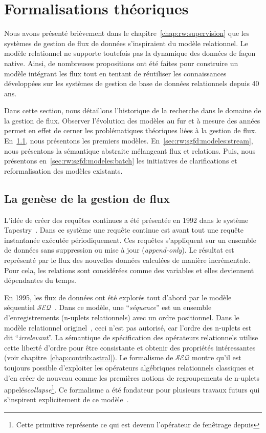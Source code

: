 \section{Formalisations théoriques}\label{sec:rw:sgfd:modeles}
Nous avons présenté brièvement dans le chapitre~\ref{chap:rw:supervision} que les systèmes de gestion de flux de données s'inspiraient du modèle relationnel. Le modèle relationnel ne supporte toutefois pas la dynamique des données de façon native. Ainsi, de nombreuses propositions ont été faites pour construire un modèle intégrant les flux tout en tentant de réutiliser les connaissances développées sur les systèmes de gestion de base de données relationnels depuis 40 ans.

Dans cette section, nous détaillons l'historique de la recherche dans le domaine de la gestion de flux. Observer l'évolution des modèles au fur et à mesure des années permet en effet de cerner les problématiques théoriques liées à la gestion de flux. En~\ref{sec:rw:sgfd:modeles:early}, nous présentons les premiers modèles. En~\ref{sec:rw:sgfd:modeles:stream}, nous présentons la sémantique abstraite mélangeant flux et relations. Puis, nous présentons en~\ref{sec:rw:sgfd:modeles:batch} les initiatives de clarifications et reformalisation des modèles existants.

\subsection{La genèse de la gestion de flux}\label{sec:rw:sgfd:modeles:early}
L'idée de créer des requêtes continues a été présentée en 1992 dans le système Tapestry~\cite{Terry:tapestry}. Dans ce système une requête continue est avant tout une requête instantanée exécutée périodiquement. Ces requêtes s'appliquent sur un ensemble de données sans suppression ou mise à jour (\textit{append-only}). Le résultat est représenté par le flux des nouvelles données calculées de manière incrémentale. Pour cela, les relations sont considérées comme des variables et elles deviennent dépendantes du temps.

En 1995, les flux de données ont été explorés tout d'abord par le modèle séquentiel $\mathcal{SEQ}$~\cite{Seshadri:seq}. Dans ce modèle, une \enquote{\it séquence} est un ensemble d'enregistrements (n-uplets relationnels) avec un ordre positionnel. Dans le modèle relationnel originel~\cite{Codd:model}, ceci n'est pas autorisé, car l'ordre des n-uplets est dit \enquote{\it irrelevant}. La sémantique de spécification des opérateurs relationnels utilise cette liberté d'ordre pour être consistante et obtenir des propriétés intéressantes (voir chapitre~\ref{chap:contrib:astral}). Le formalisme de $\mathcal{SEQ}$ montre qu'il est toujours possible d'exploiter les opérateurs algébriques relationnels classiques et d'en créer de nouveau comme les premières notions de regroupements de n-uplets appelés\textit{collapse}\footnote{Cette primitive représente ce qui est devenu l'opérateur de fenêtrage depuis}. Ce formalisme a été fondateur pour plusieurs travaux futurs qui s'inspirent explicitement de ce modèle~\cite{Gurgen:sstreamware,Babcock:issues}.

